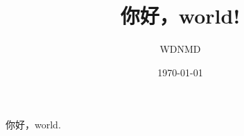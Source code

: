 \documentclass[UTF8]{ctexart}
\title{你好，world!}
\author{WDNMD}
\date{\today}
\begin{document}
\maketitle
你好，world.
\end{document}
